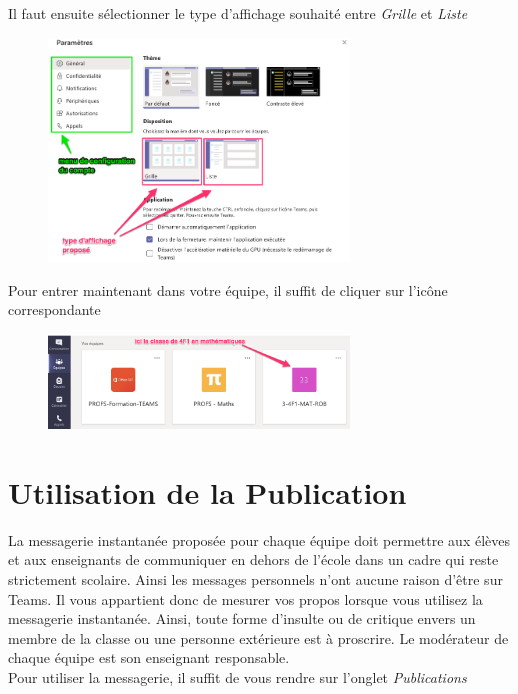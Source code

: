 Il faut ensuite sélectionner le type d'affichage souhaité entre \textit{Grille} et \textit{Liste}

\begin{figure}[h]
\includegraphics[width=8cm]{./images/teams/choix_parametre}
\centering
\end{figure}

 Pour entrer maintenant dans votre équipe, il suffit de cliquer sur l'icône correspondante

\begin{figure}[H]
\includegraphics[width=8cm]{./images/teams/entree_classe}
\centering
\end{figure}


\newpage
\section{Utilisation de la Publication}

La messagerie instantanée proposée pour chaque équipe doit permettre aux élèves et aux enseignants de communiquer en dehors de l'école dans un cadre qui reste strictement scolaire. Ainsi les messages personnels n'ont aucune raison d'être sur Teams. Il vous appartient donc de mesurer vos propos lorsque vous utilisez la messagerie instantanée. Ainsi, toute forme d'insulte ou de critique envers un membre de la classe ou une personne extérieure est à proscrire. Le modérateur de chaque équipe est son enseignant responsable.\\

Pour utiliser la messagerie, il suffit de vous rendre sur l'onglet \textit{Publications}

